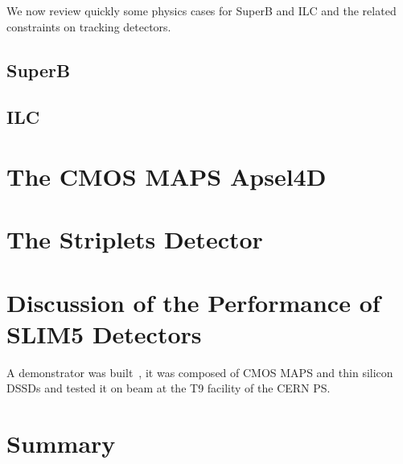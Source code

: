 We now review quickly some physics cases for SuperB and ILC and the related constraints on 
tracking detectors.
\subsection{SuperB}

\subsection{ILC}
\cite{ILCVertexing2007}


\section{The CMOS MAPS Apsel4D}
\label{sec:Apsel4D}

\section{The Striplets Detector}
\label{sec:Striplets}

\section{Discussion of the Performance of SLIM5 Detectors}
\label{sec:SLIM5Results}
A demonstrator was built~\cite{BETTARINI2010942}, it was composed of CMOS MAPS 
 and thin silicon DSSDs and tested it on beam at the T9 facility of the CERN PS. 


\section{Summary}
